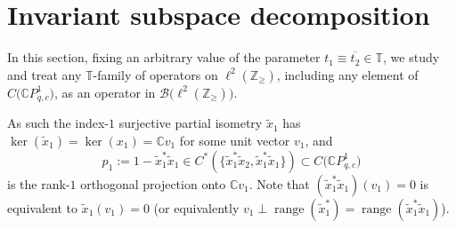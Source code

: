 \section{Invariant subspace decomposition}

In this section, fixing an arbitrary value of the parameter $t_{1}%
\equiv\overline{t_{2}}\in\mathbb{T}$, we study and treat any $\mathbb{T}%
$-family of operators on $\ell^{2} ( \mathbb{Z}_{\geq} ) $,
including any element of $C\big(\mathbb{C}P_{q,c}^{1}\big) $, as an
operator in $\mathcal{B}\big( \ell^{2} ( \mathbb{Z}_{\geq} )\big) $.

As such the index-$1$ surjective partial isometry $\tilde{x}_{1}$ has
$\ker ( \tilde{x}_{1} ) =\ker ( x_{1} ) =\mathbb{C}%
v_{1}$ for some unit vector $v_{1}$, and
\[
p_{1}:=1-\tilde{x}_{1}^{\ast}\tilde{x}_{1}\in C^{\ast} ( \{
\tilde{x}_{1}^{\ast}\tilde{x}_{2},\tilde{x}_{1}^{\ast}\tilde{x}_{1} \}
 ) \subset C\big(\mathbb{C}P_{q,c}^{1}\big)
\]
is the rank-$1$ orthogonal projection onto $\mathbb{C}v_{1}$. Note that
$ ( \tilde{x}_{1}^{\ast}\tilde{x}_{1} ) ( v_{1} ) =0$
is equivalent to $\tilde{x}_{1} ( v_{1} ) =0$ (or equivalently
$v_{1}\perp\operatorname{range} ( \tilde{x}_{1}^{\ast} )
=\operatorname{range} ( \tilde{x}_{1}^{\ast}\tilde{x}_{1} ) $).

